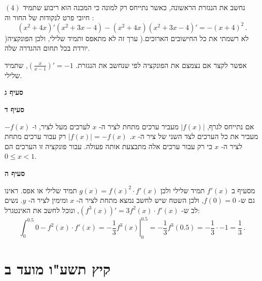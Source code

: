 $(4)$
נחשב את הנגזרת הראשונה, כאשר נתייחס רק למונה כי המכנה הוא ריבוע שתמיד חיובי פרט לנקודות של החור וה%
\asm{}:
\[
(x^2+4x)'(x^2+3x-4)-(x^2+4x)(x^2+3x-4)'=-(x+4)^2\,.
\]
)לא רשמתי את כל החישובים הארוכים.( ערך זה לא מתאפס ותמיד שלילי, ולכן הפונקציה יורדת בכל תחום ההגדרה שלה.

אפשר לקצר אם נצמצם את הפונקציה לפי שנחשב את הנגזרת. 
$\left(\frac{x}{x-1}\right)'=-1$,
שתמיד שלילי.

\textbf{סעיף ג}
\begin{center}
\end{center}
\textbf{סעיף ד}

אם נתייחס לגרף, 
$|f(x)|$
מעביר ערכים מתחת לציר ה-%
$x$
לערכים מעל לציר, ו-%
$-f(x)$
מעביר את כל הערכים לצד השני של ציר ה-%
$x$.
$|f(x)|=-f(x)$
רק עבור ערכים מתחת לציר ה-%
$x$
כי רק עבור ערכים אלה מתבצעת אותה פעולה. עבור פונקציה זו הערכים הם
$0\leq x < 1$.

\textbf{סעיף ה}

מסעיף ב 
$f'(x)$
תמיד שלילי ולכן
$g(x)=f(x)^2\cdot f'(x)$
תמיד שלילי או אפס. ראינו גם ש-%
$f(0)=0$,
ולכן השטח שיש לחשב נמצא מתחת לציר ה-%
$x$
ומימין לציר ה-%
$y$.
נשים לב ש-%
$(f^3(x))'=3f^2(x)\cdot f'(x)$,
ונוכל לחשב את האינטגרל:
\[
\int_0^{0.5} 0-f^2(x)\cdot f'(x)=\left.-\frac{1}{3}f^3(x)\right|^{0.5}_0=-\frac{1}{3}f^3(0.5)=-\frac{1}{3}\cdot -1=\frac{1}{3}\,.
\]

\np

\section{קיץ תשע"ו מועד ב}

